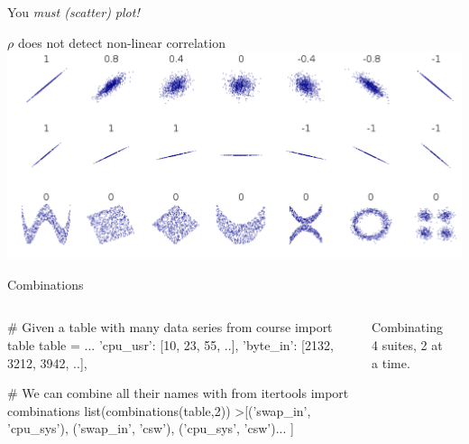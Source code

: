 \begin{pyframe}{You \emph{must (scatter) plot!}}
\LARGE
\begin{center}
$\rho$ does not detect non-linear correlation \\
\includegraphics[width=.8\textwidth]{correlation.pdf} \\
\end{center}
\end{pyframe}


\begin{pyframe}{Combinations } %
\begin{columns}
\begin{pycode}
# Given a table with many data series
from course import table
table = {...
  'cpu_usr': [10, 23, 55, ..],
  'byte_in': [2132, 3212, 3942, ..], }

# We can combine all their names with
from itertools import combinations
list(combinations(table,2))
>[('swap_in', 'cpu_sys'),
 ('swap_in', 'csw'),  ('cpu_sys', 'csw')... ]








\end{pycode}
Combinating 4 suites, 2 at a time.\\
\begin{center}
\\
\hearts \spades \\
\hearts \clubs \\
\hearts \diamonds \\
\spades \clubs \\
\spades \diamonds \\
\clubs \diamonds \\
\end{center}
\end{columns}
\end{pyframe}


